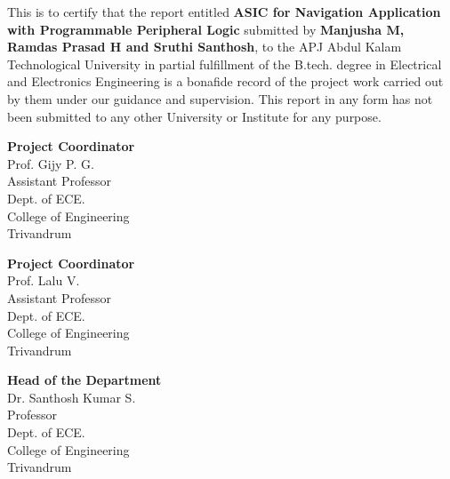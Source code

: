 \documentclass[12pt,a4paper]{report}
\begin{document}
This is to certify that the report entitled \textbf{ \large ASIC for Navigation Application with Programmable Peripheral Logic} submitted by \textbf{Manjusha M, Ramdas Prasad H and Sruthi Santhosh}, to the APJ Abdul Kalam Technological University in partial fulfillment of the B.tech. degree in Electrical and Electronics Engineering is a bonafide record of the project work carried out by them under our
guidance and supervision. This report in any form has not been submitted to any other University or Institute for any purpose.

\noindent 
\begin{minipage}{0.35\linewidth}
\begin{flushleft}
\vspace{2 cm}
                         
\textbf{Project Coordinator} \\
\vspace{0.8cm}
Prof. Gijy P. G.\\
\footnotesize{Assistant Professor\\
Dept. of ECE.\\
College of Engineering\\
Trivandrum}\\
\end{flushleft} 
\end{minipage}
\begin{minipage}{0.35\linewidth}
\begin{center}
\vspace{2 cm}
                         
\textbf{Project Coordinator} \\
\vspace{0.8cm}
Prof. Lalu V.\\
\footnotesize{Assistant Professor\\
Dept. of ECE.\\
College of Engineering\\
Trivandrum}\\
\end{center} 
\end{minipage}
\begin{minipage}{0.35\linewidth}
\begin{flushright}                                      
\vspace{2cm}                         
\textbf{Head of the Department} \\
\vspace{.8cm}
Dr. Santhosh Kumar S.\\
\footnotesize{Professor\\
Dept. of ECE.\\
College of Engineering \\
Trivandrum}\\
\end{flushright} 
\end{minipage}
\thispagestyle{empty}
\end{document}
